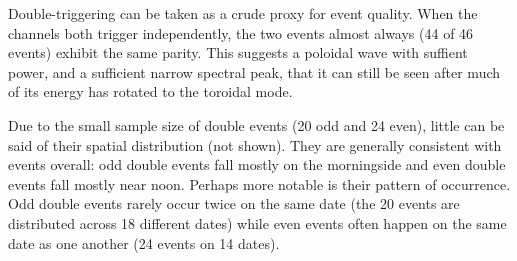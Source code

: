 Double-triggering can be taken as a crude proxy for event quality. When the
channels both trigger independently, the two events almost always (44 of 46
events) exhibit the same parity. This suggests a poloidal wave with suffient
power, and a sufficient narrow spectral peak, that it can still be seen after
much of its energy has rotated to the toroidal mode. 

Due to the small sample size of double events (20 odd and 24 even), little
can be said of their spatial distribution (not shown). They are generally
consistent with events overall: odd double events fall mostly on the
morningside and even double events fall mostly near noon. Perhaps more notable
is their pattern of occurrence. Odd double events rarely occur twice on the
same date (the 20 events are distributed across 18 different dates) while even
events often happen on the same date as one another (24 events on 14 dates). 





